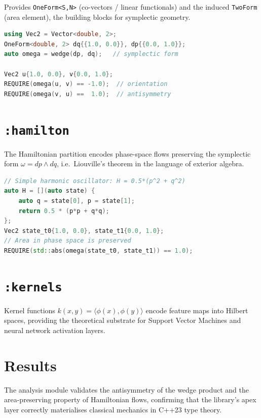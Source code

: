 \documentclass[11pt, a4paper]{report}
\begin{document}
Provides \texttt{OneForm<S,N>} (co-vectors / linear functionals) and the induced \texttt{TwoForm} (area element), the building blocks for symplectic geometry.

\begin{lstlisting}[language=C++, caption={Analysis: symplectic 2-form and area preservation (from \texttt{hamilton\_test.cpp}).}, label={lst:analysis-forms}]
using Vec2 = Vector<double, 2>;
OneForm<double, 2> dq{{1.0, 0.0}}, dp{{0.0, 1.0}};
auto omega = wedge(dp, dq);   // symplectic form

Vec2 u{1.0, 0.0}, v{0.0, 1.0};
REQUIRE(omega(u, v) == -1.0);  // orientation
REQUIRE(omega(v, u) ==  1.0);  // antisymmetry
\end{lstlisting}

\section{\texttt{:hamilton}}
\label{sec:analysis-hamilton}

The Hamiltonian partition encodes phase-space flows preserving the symplectic form $\omega = dp \wedge dq$, i.e.\ Liouville's theorem in the language of exterior algebra.

\begin{lstlisting}[language=C++, caption={Analysis: Hamiltonian area preservation (from \texttt{hamilton\_test.cpp}).}, label={lst:analysis-hamilton}]
// Simple harmonic oscillator: H = 0.5*(p^2 + q^2)
auto H = [](auto state) {
    auto q = state[0], p = state[1];
    return 0.5 * (p*p + q*q);
};
Vec2 state_t0{1.0, 0.0}, state_t1{0.0, 1.0};
// Area in phase space is preserved
REQUIRE(std::abs(omega(state_t0, state_t1)) == 1.0);
\end{lstlisting}

\section{\texttt{:kernels}}
\label{sec:analysis-kernels}

Kernel functions $k(x, y) = \langle \phi(x), \phi(y) \rangle$ encode feature maps into Hilbert spaces, providing the theoretical substrate for Support Vector Machines and neural network activation layers.

\section{Results}

The analysis module validates the antisymmetry of the wedge product and the area-preserving property of Hamiltonian flows, confirming that the library's apex layer correctly materialises classical mechanics in C++23 type theory.
\end{document}
